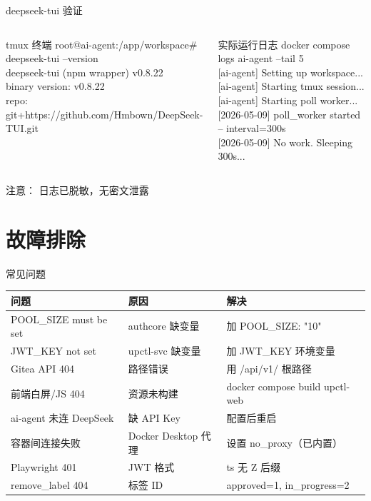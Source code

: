 \documentclass[10pt,aspectratio=169,utf8]{beamer}
\begin{document}
\begin{frame}[fragile]{deepseek-tui 验证}
  \begin{columns}[T]
    \begin{block}{tmux 终端}
      \tiny
      root@ai-agent:/app/workspace\# deepseek-tui --version\\
      deepseek-tui (npm wrapper) v0.8.22\\
      binary version: v0.8.22\\
      repo: git+https://github.com/Hmbown/DeepSeek-TUI.git
    \end{block}

    \begin{block}{实际运行日志}
      \tiny
      docker compose logs ai-agent --tail 5\\
      {[}ai-agent{]} Setting up workspace...\\
      {[}ai-agent{]} Starting tmux session...\\
      {[}ai-agent{]} Starting poll worker...\\
      {[}2026-05-09{]} poll\_worker started -- interval=300s\\
      {[}2026-05-09{]} No work. Sleeping 300s...
    \end{block}
  \end{columns}
  \vspace{4pt}
  \textcolor{myblue}{注意：} 日志已脱敏，无密文泄露
\end{frame}

\section{故障排除}

\begin{frame}{常见问题}
  \fontsize{7.5}{9.5}\selectfont
  \begin{tabular}{p{3.5cm}p{3cm}p{5.5cm}}
    \toprule
    问题 & 原因 & 解决 \\
    \midrule
    POOL\_SIZE must be set & authcore 缺变量 & 加 POOL\_SIZE: "10" \\
    JWT\_KEY not set & upctl-svc 缺变量 & 加 JWT\_KEY 环境变量 \\
    Gitea API 404 & 路径错误 & 用 /api/v1/ 根路径 \\
    前端白屏/JS 404 & 资源未构建 & docker compose build upctl-web \\
    ai-agent 未连 DeepSeek & 缺 API Key & 配置后重启 \\
    容器间连接失败 & Docker Desktop 代理 & 设置 no\_proxy（已内置） \\
    Playwright 401 & JWT 格式 & ts 无 Z 后缀 \\
    remove\_label 404 & 标签 ID & approved=1, in\_progress=2 \\
    \bottomrule
  \end{tabular}
\end{frame}
\end{document}
